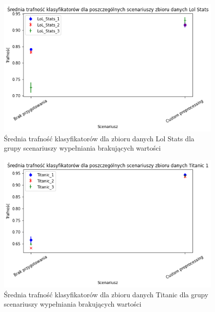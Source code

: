 \documentclass{book}
\begin{document}
\begin{figure}[H]
    \centerline{\includegraphics[scale=0.5]{Lol_Stats_Avg_Custom}}
    \centering
    \caption{Średnia trafność klasyfikatorów dla zbioru danych Lol Stats 
    dla grupy scenariuszy wypełniania brakujących wartości}
    \end{figure}

\begin{figure}[H]
    \centerline{\includegraphics[scale=0.5]{Titanic_Avg_Custom}}
    \centering
    \caption{Średnia trafność klasyfikatorów dla zbioru danych Titanic 
    dla grupy scenariuszy wypełniania brakujących wartości}
    \end{figure}
\end{document}
